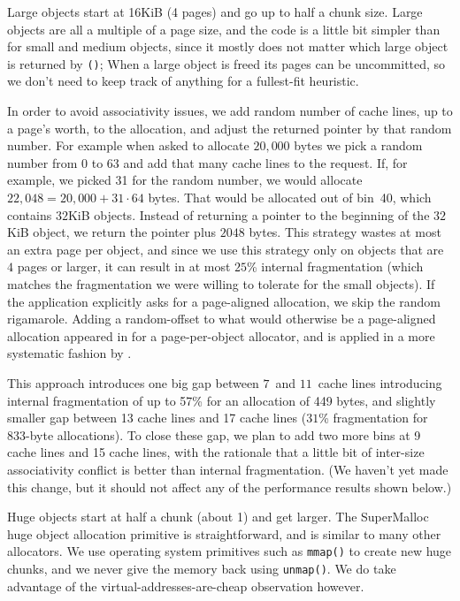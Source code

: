\documentclass[pldi]{sigplanconf-pldi15}
\newcommand{\code}[1]{\texttt{#1}}
\begin{document}

Large objects start at 16KiB (4 pages) and go up to half a chunk size.
Large objects are all a multiple of a page size, and the code is a
little bit simpler than for small and medium objects, since it mostly
does not matter which large object is returned by \code{\malloc()};
When a large object is freed its pages can be uncommitted, so we don't
need to keep track of anything for a fullest-fit heuristic.

In order to avoid associativity issues, we add random number of cache
lines, up to a page's worth, to the allocation, and adjust the
returned pointer by that random number.  For example when asked to
allocate $20,000$ bytes we pick a random number from 0 to 63 and add
that many cache lines to the request.  If, for example, we picked 31
for the random number, we would allocate $22,048 = 20,000+31\cdot64$
bytes.  That would be allocated out of bin~40, which contains $32$KiB
objects.  Instead of returning a pointer to the beginning of the
$32$KiB object, we return the pointer plus $2048$ bytes.  This
strategy wastes at most an extra page per object, and since we use
this strategy only on objects that are $4$ pages or larger, it can
result in at most $25$\% internal fragmentation (which matches the
fragmentation we were willing to tolerate for the small objects).  If
the application explicitly asks for a page-aligned allocation, we skip
the random rigamarole.  Adding a random-offset to what would otherwise
be a page-aligned allocation appeared in \cite{LvinNoBe08} for a
page-per-object allocator, and is applied in a more systematic fashion
by \cite{AfekDiMo11}.

This approach introduces one big gap between $7$~and $11$~cache lines
introducing internal fragmentation of up to 57\% for an allocation of
449 bytes, and slightly smaller gap between 13 cache lines and 17
cache lines ($31$\% fragmentation for 833-byte allocations).  To close
these gap, we plan to add two more bins at 9 cache lines and 15 cache
lines, with the rationale that a little bit of inter-size
associativity conflict is better than internal fragmentation.  (We
haven't yet made this change, but it should not affect any of the
performance results shown below.)


Huge objects start at half a chunk (about \unit{1}\mebi\byte{}) and
get larger.  The SuperMalloc huge object allocation primitive is
straightforward, and is similar to many other allocators.  We use
operating system primitives such as \code{mmap()} to create new huge
chunks, and we never give the memory back using \code{unmap()}.  We do
take advantage of the virtual-addresses-are-cheap observation however.
\end{document}
